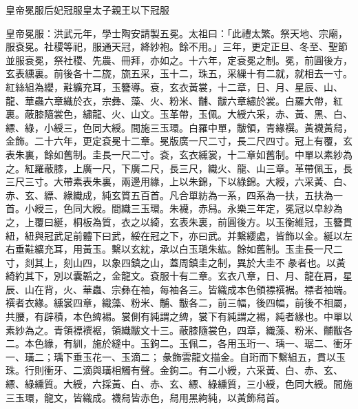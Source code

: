 皇帝冕服后妃冠服皇太子親王以下冠服

皇帝冕服：洪武元年，學士陶安請製五冕。太祖曰：「此禮太繁。祭天地、宗廟，服袞冕。社稷等祀，服通天冠，絳紗袍。餘不用。」三年，更定正旦、冬至、聖節並服袞冕，祭社稷、先農、冊拜，亦如之。十六年，定袞冕之制。冕，前圓後方，玄表纁裏。前後各十二旒，旒五采，玉十二，珠五，采繅十有二就，就相去一寸。紅絲組為纓，黈纊充耳，玉簪導。袞，玄衣黃裳，十二章，日、月、星辰、山、龍、華蟲六章織於衣，宗彝、藻、火、粉米、黼、黻六章繡於裳。白羅大帶，紅裏。蔽膝隨裳色，繡龍、火、山文。玉革帶，玉佩。大綬六采，赤、黃、黑、白、縹、綠，小綬三，色同大綬。間施三玉環。白羅中單，黻領，青緣襈。黃襪黃舄，金飾。二十六年，更定袞冕十二章。冕版廣一尺二寸，長二尺四寸。冠上有覆，玄表朱裏，餘如舊制。圭長一尺二寸。袞，玄衣纁裳，十二章如舊制。中單以素紗為之。紅羅蔽膝，上廣一尺，下廣二尺，長三尺，織火、龍、山三章。革帶佩玉，長三尺三寸。大帶素表朱裏，兩邊用緣，上以朱錦，下以綠錦。大綬，六采黃、白、赤、玄、縹、綠織成，純玄質五百首。凡合單紡為一系，四系為一扶，五扶為一首。小綬三，色同大綬。間織三玉環。朱襪，赤舄。永樂三年定，冕冠以皁紗為之，上覆曰綖，桐板為質，衣之以綺，玄表朱裏，前圓後方。以玉衡維冠，玉簪貫紐，紐與冠武足前體下曰武，綏在冠之下，亦曰武。并繫纓處，皆飾以金。綖以左右垂黈纊充耳，用黃玉。繫以玄紞，承以白玉瑱朱紘。餘如舊制。玉圭長一尺二寸，剡其上，刻山四，以象四鎮之山，蓋周鎮圭之制，異於大圭不彖者也。以黃綺約其下，別以囊韜之，金龍文。袞服十有二章。玄衣八章，日、月、龍在肩，星辰、山在背，火、華蟲、宗彝在袖，每袖各三。皆織成本色領褾襈裾。褾者袖端。襈者衣緣。纁裳四章，織藻、粉米、黼、黻各二，前三幅，後四幅，前後不相屬，共腰，有辟積，本色綼裼。裳側有純謂之綼，裳下有純謂之裼，純者緣也。中單以素紗為之。青領褾襈裾，領織黻文十三。蔽膝隨裳色，四章，織藻、粉米、黼黻各二。本色緣，有紃，施於縫中。玉鉤二。玉佩二，各用玉珩一、瑀一、琚二、衝牙一、璜二；瑀下垂玉花一、玉滴二；彖飾雲龍文描金。自珩而下繫組五，貫以玉珠。行則衝牙、二滴與璜相觸有聲。金鉤二。有二小綬，六采黃、白、赤、玄、縹、綠纁質。大綬，六採黃、白、赤、玄、縹、綠纁質，三小綬，色同大綬。間施三玉環，龍文，皆織成。襪舄皆赤色，舄用黑絇純，以黃飾舄首。

